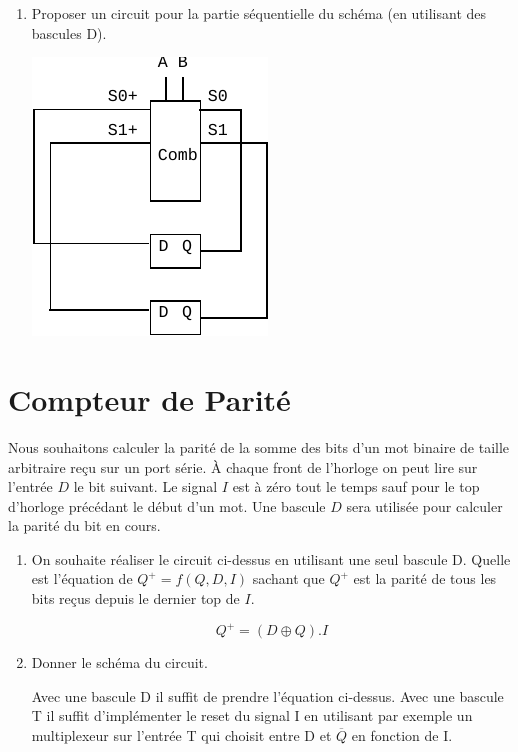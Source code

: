 \documentclass[a4paper,10pt]{exam}
\begin{document}
\begin{enumerate}
  \item Proposer un circuit pour la partie séquentielle du schéma (en utilisant
    des bascules D).
    \begin{solution}
      \includegraphics{TD9-auto2}
    \end{solution}

\end{enumerate}

\section{Compteur de Parité}
Nous souhaitons calculer la parité de la somme des bits d'un mot binaire de
taille arbitraire reçu sur un port série. À chaque front de l'horloge on peut
lire sur l'entrée $D$ le bit suivant. Le signal $I$ est à zéro tout le temps
sauf pour le top d'horloge précédant le début d'un mot. Une bascule $D$ sera
utilisée pour calculer la parité du bit en cours.

\begin{enumerate}
  \item On souhaite réaliser le circuit ci-dessus en utilisant une seul bascule
    D. Quelle est l'équation de $Q^{+} = f(Q,D,I)$ sachant que $Q^{+}$ est la
    parité de tous les bits reçus depuis le dernier top de $I$.

    \begin{solution}
      $$Q^+ = (D \oplus Q).I $$
    \end{solution}
  \item Donner le schéma du circuit.
    \begin{solution}
      Avec une bascule D il suffit de prendre l'équation ci-dessus.
      Avec une bascule T il suffit d'implémenter le reset du signal I en
      utilisant par exemple un multiplexeur sur l'entrée T qui choisit entre
      D et $\overline{Q}$ en fonction de I.
    \end{solution}
\end{enumerate}
\end{document}
